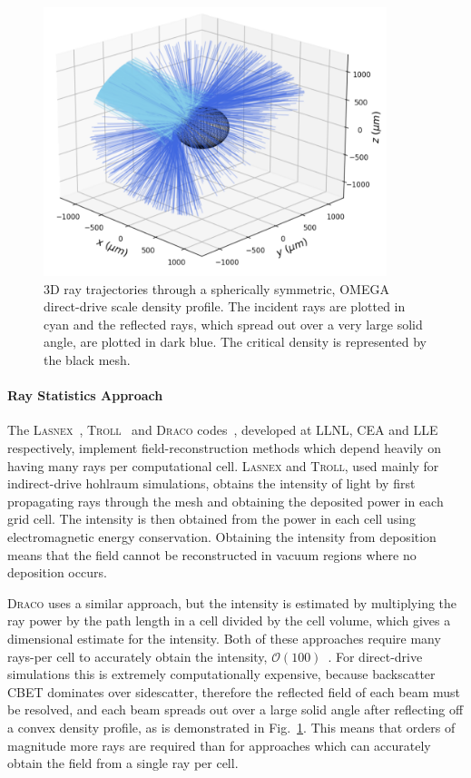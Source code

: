 \begin{figure}[t!]
\includegraphics[width=10cm]{Numerics/Images/Reflected_Rays.png}
\centering
\caption{3D ray trajectories through a spherically symmetric, OMEGA direct-drive scale density profile.
The incident rays are plotted in cyan and the reflected rays, which spread out over a very large solid angle, are plotted in dark blue.
The critical density is represented by the black mesh.}%
\label{fig:reflectedrays}
\end{figure}

\paragraph*{Ray Statistics Approach} The \textsc{Lasnex}~\cite{strozzi_interplay_2017}, \textsc{Troll}~\cite{liberatore_first_2023} and \textsc{Draco} codes~\cite{marozas_wavelength-detuning_2018}, developed at \ac{LLNL}, \ac{CEA} and \ac{LLE} respectively, implement field-reconstruction methods which depend heavily on having many rays per computational cell.
\textsc{Lasnex} and \textsc{Troll}, used mainly for indirect-drive hohlraum simulations, obtains the intensity of light by first propagating rays through the mesh and obtaining the deposited power in each grid cell.
The intensity is then obtained from the power in each cell using electromagnetic energy conservation.
Obtaining the intensity from deposition means that the field cannot be reconstructed in vacuum regions where no deposition occurs.

\textsc{Draco} uses a similar approach, but the intensity is estimated by multiplying the ray power by the path length in a cell divided by the cell volume, which gives a dimensional estimate for the intensity.
Both of these approaches require many rays-per cell to accurately obtain the intensity, $\mathcal{O}(100)$~\cite{debayle_unified_2019}.
For direct-drive simulations this is extremely computationally expensive, because backscatter \ac{CBET} dominates over sidescatter, therefore the reflected field of each beam must be resolved, and each beam spreads out over a large solid angle after reflecting off a convex density profile, as is demonstrated in Fig.~\ref{fig:reflectedrays}.
This means that orders of magnitude more rays are required than for approaches which can accurately obtain the field from a single ray per cell.

